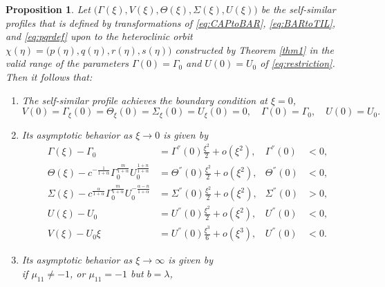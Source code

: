 \documentclass[a4paper,11pt]{article}
\newtheorem{proposition}{Proposition}[section]
\theoremstyle{remark}
\begin{document}
%
%
\begin{proposition} \label{prop:ss}
Let $\big(\Gamma(\xi),V(\xi),\Theta(\xi),\Sigma(\xi),U(\xi)\big)$ be the self-similar profiles that is defined by transformations of \eqref{eq:CAPtoBAR}, \eqref{eq:BARtoTIL}, and \eqref{eq:pqrdef} upon to the heteroclinic orbit $\chi(\eta)=\big(p(\eta),q(\eta),r(\eta),s(\eta)\big)$ constructed by Theorem \ref{thm1} in the valid range of the parameters $\Gamma(0)=\Gamma_0$ and $U(0)=U_0$ of \eqref{eq:restriction}. Then it follows that:
 \begin{enumerate}
  \item[(i)] The self-similar profile achieves the boundary condition at $\xi=0$,
    \begin{equation*}
    {V}(0) = \Gamma_\xi(0) = \Theta_\xi(0)=\Sigma_\xi(0) = {U}_\xi(0)=0, \quad \Gamma(0)=\Gamma_0, \quad U(0)=U_0.
  \end{equation*}
  \item[(ii)] Its asymptotic behavior as $\xi \rightarrow 0$ is given by
  \begin{equation} \label{eq:ss_asymp0}
  \begin{aligned}
    \Gamma(\xi) -\Gamma_0 &= \Gamma^{''}(0)\frac{\xi^2}{2} + o(\xi^2), & \Gamma^{''}(0)&<0,\\
    \Theta(\xi) - c^{-\frac{1}{1+\alpha}}\Gamma_0^{\frac{m}{1+\alpha}} U_0^{\frac{1+n}{1+\alpha}} &= \Theta^{''}(0)\frac{\xi^2}{2} + o(\xi^2), & \Theta^{''}(0)&<0,\\
    \Sigma(\xi) - c^{\frac{\alpha}{1+\alpha}}\Gamma_0^{\frac{m}{1+\alpha}} U_0^{-\frac{\alpha-n}{1+\alpha}} &= \Sigma^{''}(0)\frac{\xi^2}{2} + o(\xi^2), & \Sigma^{''}(0)&>0, \\
    U(\xi) - U_0 &= U^{''}(0)\frac{\xi^2}{2} + o(\xi^2), & U^{''}(0)&<0,\\
    V(\xi) - U_0\xi &= U^{''}(0)\frac{\xi^3}{6} + o(\xi^3), & U^{''}(0)&<0.
  \end{aligned}
  \end{equation}
  \item[(iii)] Its asymptotic behavior as $\xi \rightarrow \infty$ is given by\\
  if $\mu_{11}\ne-1$, or $\mu_{11}=-1$ but $b=\lambda$,

\end{enumerate}
\end{proposition}
\end{document}

